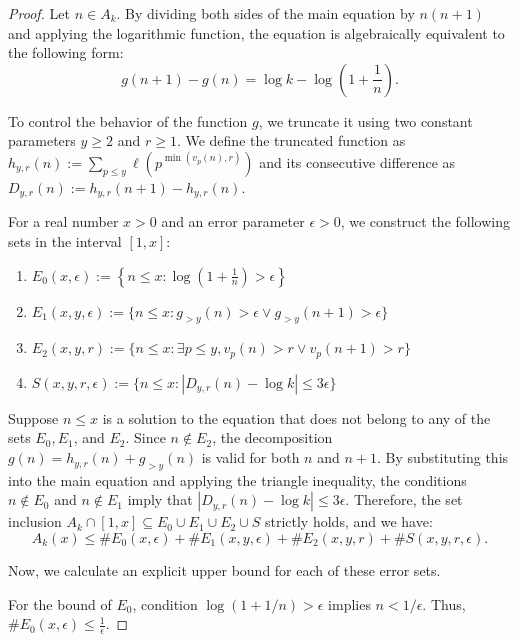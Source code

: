 \documentclass[10pt,a4paper]{amsart}
\begin{document}
\begin{proof}
Let $n \in A_k$. By dividing both sides of the main equation by $n(n + 1)$ and applying the logarithmic function, the equation is algebraically equivalent to the following form:
\[ g(n + 1) - g(n) = \log k - \log \left(1 + \frac{1}{n}\right). \]

To control the behavior of the function $g$, we truncate it using two constant parameters $y \geq 2$ and $r \geq 1$. We define the truncated function as $h_{y,r}(n) := \sum_{p \leq y} \ell\left(p^{\min{(v_p(n), r)}}\right)$ and its consecutive difference as $D_{y,r}(n) := h_{y,r}(n + 1) - h_{y,r}(n)$.

For a real number $x > 0$ and an error parameter $\epsilon > 0$, we construct the following sets in the interval $[1, x]$:
\begin{enumerate}
    \item $E_0(x, \epsilon) := \left\{n \leq x : \log \left(1 + \frac{1}{n}\right) > \epsilon \right\}$
    \item $E_1(x, y, \epsilon) := \{n \leq x : g_{>y}(n) > \epsilon \lor g_{>y}(n + 1) > \epsilon\}$
    \item $E_2(x, y, r) := \{n \leq x : \exists p \leq y, v_p(n) > r \lor v_p(n + 1) > r\}$
    \item $S(x, y, r, \epsilon) := \{n \leq x : |D_{y,r}(n) - \log k| \leq 3\epsilon\}$
\end{enumerate}

Suppose $n \leq x$ is a solution to the equation that does not belong to any of the sets $E_0, E_1$, and $E_2$. Since $n \notin E_2$, the decomposition $g(n) = h_{y,r}(n) + g_{>y}(n)$ is valid for both $n$ and $n + 1$. By substituting this into the main equation and applying the triangle inequality, the conditions $n \notin E_0$ and $n \notin E_1$ imply that $|D_{y,r}(n) - \log k| \leq 3\epsilon$. Therefore, the set inclusion $A_k \cap [1, x] \subseteq E_0 \cup E_1 \cup E_2 \cup S$ strictly holds, and we have:
\begin{equation}
A_k(x) \leq \text{\#}E_0(x, \epsilon) + \text{\#}E_1(x, y, \epsilon) + \text{\#}E_2(x, y, r) + \text{\#}S(x, y, r, \epsilon). \label{eq:1}
\end{equation}

Now, we calculate an explicit upper bound for each of these error sets.

For the bound of $E_0$, condition $\log \left(1 + 1/n\right) > \epsilon$ implies $n < 1/\epsilon$. Thus, $\text{\#}E_0(x, \epsilon) \leq \frac{1}{\epsilon}$.


\end{proof}
\end{document}
